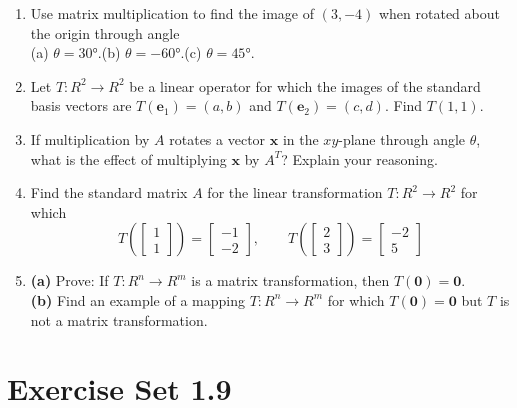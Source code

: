 \documentclass{article}
\theoremstyle{mystyle}
\begin{document}
\begin{enumerate}
\item[37.] Use matrix multiplication to find the image of $(3,-4)$ when rotated about the origin through angle\\
(a) $\theta=30°$.\quad (b) $\theta=-60°$.\quad (c) $\theta=45°$.

\item[39.] Let $T:R^2\to R^2$ be a linear operator for which the images of the standard basis vectors are $T(\mathbf{e}_1)=(a,b)$ and $T(\mathbf{e}_2)=(c,d)$. Find $T(1,1)$.

\item[44.] If multiplication by $A$ rotates a vector $\mathbf{x}$ in the $xy$-plane through angle $\theta$, what is the effect of multiplying $\mathbf{x}$ by $A^T$? Explain your reasoning.

\item[45.] Find the standard matrix $A$ for the linear transformation $T:R^2\to R^2$ for which
\[
T\!\left(\begin{bmatrix}1\\1\end{bmatrix}\right)=\begin{bmatrix}-1\\-2\end{bmatrix},\qquad
T\!\left(\begin{bmatrix}2\\3\end{bmatrix}\right)=\begin{bmatrix}-2\\5\end{bmatrix}
\]

\item[50.] \textbf{(a)} Prove: If $T:R^n\to R^m$ is a matrix transformation, then $T(\mathbf{0})=\mathbf{0}$.\\
\textbf{(b)} Find an example of a mapping $T:R^n\to R^m$ for which $T(\mathbf{0})=\mathbf{0}$ but $T$ is not a matrix transformation.
\end{enumerate}

\section*{Exercise Set 1.9}
\end{document}
